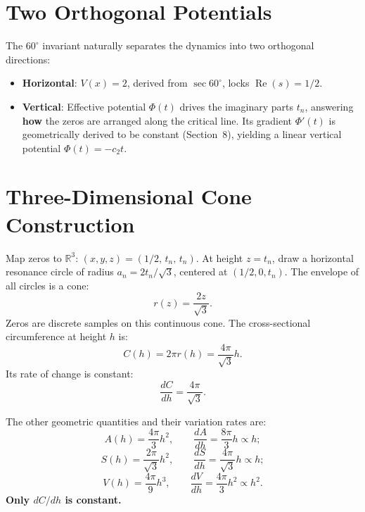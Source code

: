 \documentclass[12pt,a4paper]{article}
\begin{document}
\section{Two Orthogonal Potentials}

The $60^\circ$ invariant naturally separates the dynamics into two orthogonal directions:

\begin{itemize}
\item \textbf{Horizontal}: $V(x)=2$, derived from $\sec 60^\circ$, locks $\operatorname{Re}(s)=1/2$.
\item \textbf{Vertical}: Effective potential $\Phi(t)$ drives the imaginary parts $t_n$, answering \textbf{how} the zeros are arranged along the critical line. Its gradient $\Phi'(t)$ is geometrically derived to be constant (Section~8), yielding a linear vertical potential $\Phi(t) = -c_2 t$.
\end{itemize}

\section{Three-Dimensional Cone Construction}

Map zeros to $\mathbb{R}^3$: $(x,y,z) = (1/2,\, t_n,\, t_n)$. At height $z=t_n$, draw a horizontal resonance circle of radius $a_n = 2t_n/\sqrt{3}$, centered at $(1/2, 0, t_n)$. The envelope of all circles is a cone:
\begin{equation}
r(z) = \frac{2z}{\sqrt{3}}.
\end{equation}
Zeros are discrete samples on this continuous cone. The cross-sectional circumference at height $h$ is:
\begin{equation}
C(h) = 2\pi r(h) = \frac{4\pi}{\sqrt{3}}h.
\end{equation}
Its rate of change is constant:
\begin{equation}
\frac{dC}{dh} = \frac{4\pi}{\sqrt{3}}.
\end{equation}

The other geometric quantities and their variation rates are:
\begin{equation}
A(h) = \frac{4\pi}{3}h^2, \qquad \frac{dA}{dh} = \frac{8\pi}{3}h \propto h;
\end{equation}
\begin{equation}
S(h) = \frac{2\pi}{\sqrt{3}}h^2, \qquad \frac{dS}{dh} = \frac{4\pi}{\sqrt{3}}h \propto h;
\end{equation}
\begin{equation}
V(h) = \frac{4\pi}{9}h^3, \qquad \frac{dV}{dh} = \frac{4\pi}{3}h^2 \propto h^2.
\end{equation}
\textbf{Only $dC/dh$ is constant.}
\end{document}
